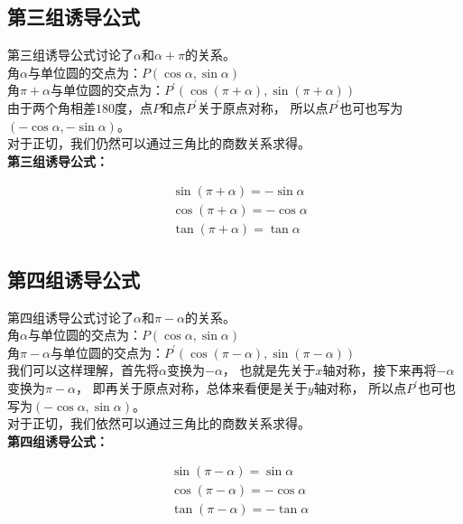 \documentclass[UTF8]{ctexart}
\begin{document}
\subsection{第三组诱导公式}
    第三组诱导公式讨论了$\alpha$和$\alpha+\pi$的关系。\\[3mm]
    角$\alpha$与单位圆的交点为：$P(\cos{\alpha},\sin{\alpha})$\\
    角$\pi+\alpha$与单位圆的交点为：$P^{'}(\cos{(\pi+\alpha)},\sin{(\pi+\alpha)})$\\[3mm]
    由于两个角相差$180$度，点$P$和点$P^{'}$关于原点对称，
    所以点$P^{'}$也可也写为$(-\cos{\alpha},-\sin{\alpha})$。\\[3mm]
    对于正切，我们仍然可以通过三角比的商数关系求得。\\
    \newline
    \textbf{第三组诱导公式：}
    \begin{large}
    \begin{align*}
        &\sin{(\pi+\alpha)}=-\sin \alpha\\[3mm]
        &\cos{(\pi+\alpha)}=-\cos \alpha\\[3mm]
        &\tan{(\pi+\alpha)}=\tan \alpha
    \end{align*}
    \end{large}

\subsection{第四组诱导公式}
    第四组诱导公式讨论了$\alpha$和$\pi-\alpha$的关系。\\[3mm]
    角$\alpha$与单位圆的交点为：$P(\cos{\alpha},\sin{\alpha})$\\
    角$\pi-\alpha$与单位圆的交点为：$P^{'}(\cos{(\pi-\alpha)},\sin{(\pi-\alpha)})$\\[3mm]
    我们可以这样理解，首先将$\alpha$变换为$-\alpha$，
    也就是先关于$x$轴对称，接下来再将$-\alpha$变换为$\pi-\alpha$，
    即再关于原点对称，总体来看便是关于$y$轴对称，
    所以点$P^{'}$也可也写为$(-\cos{\alpha},\sin{\alpha})$。\\[3mm]
    对于正切，我们依然可以通过三角比的商数关系求得。\\
    \newline
    \textbf{第四组诱导公式：}
    \begin{large}
    \begin{align*}
        &\sin{(\pi-\alpha)}=\sin \alpha\\[3mm]
        &\cos{(\pi-\alpha)}=-\cos \alpha\\[3mm]
        &\tan{(\pi-\alpha)}=-\tan \alpha
    \end{align*}
    \end{large}
\end{document}
